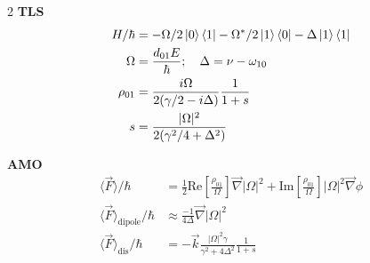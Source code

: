 \documentclass[12pt]{article}
\begin{document}
\begin{multicols}{2}
\textbf{TLS}
  \begin{align}
    H/\hbar &= -\Omega/2 \ket{0} \bra{1} -\Omega^{*}/2 \ket{1} \bra{0} - \Delta \ket{1} \bra{1}\\
    \Omega &= \frac{d_{01} E}{\hbar}; \quad \Delta = \nu - \omega_{10}\\
    \rho_{01} &= \frac{i\Omega}{2(\gamma/2 - i\Delta)} \frac{1}{1 + s}\\
    s &= \frac{\lvert \Omega \rvert^2}{2(\gamma^2/4 + \Delta^2)}
  \end{align}

  \textbf{AMO}
  \begin{align}
    \langle \vec{F} \rangle / \hbar &= \frac{1}{2} \textrm{Re}[\frac{\rho_{01}}{\Omega}]\vec{\nabla} \lvert \Omega \rvert^2
    + \textrm{Im}[\frac{\rho_{01}}{\Omega}] \lvert \Omega \rvert^2 \vec{\nabla} \phi\\
    \langle \vec{F} \rangle_{\textrm{dipole}} / \hbar &\approx \frac{-1}{4 \Delta} \vec{\nabla} \lvert \Omega \rvert^2\\
    \langle \vec{F} \rangle_{\textrm{dis}} / \hbar &= -\vec{k} \frac{\lvert \Omega \rvert^2 \gamma}{\gamma^2 + 4 \Delta^2} \frac{1}{1 + s}
  \end{align}



\end{multicols}
\end{document}
